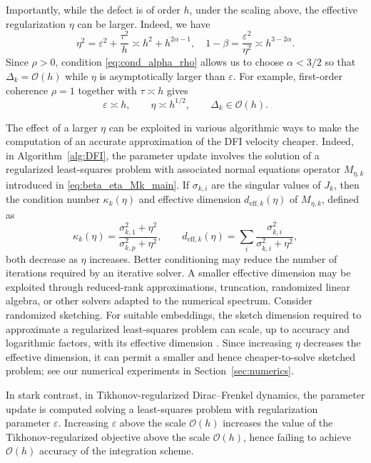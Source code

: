 \documentclass[oneside,11pt]{article}
\theoremstyle{remark}
\theoremstyle{thmstyleone}
\theoremstyle{thmstylethree}
\theoremstyle{thmstyletwo}
\begin{document}
{  Importantly, while the defect is of order $h$, under the scaling above, the effective regularization $\eta$ can be larger. 
  Indeed, we have 
  \begin{equation*}
    \eta^2
    =
    \varepsilon^2+\frac{\tau^2}{h}
    \asymp
    h^2+h^{2\alpha-1},
    \quad
    1-\beta = \frac{\varepsilon^2}{\eta^2} \asymp h^{3 - 2\alpha}
    .
  \end{equation*}
  Since $\rho > 0$, condition \eqref{eq:cond_alpha_rho} allows us to choose $\alpha < 3/2$ so that 
  $\Delta_k=\mathcal{O}(h)$ while $\eta$ is asymptotically larger than $\varepsilon$.
  For example, first-order coherence $\rho=1$ together with $\tau\asymp h$ gives
  \begin{equation*}
    \varepsilon\asymp h,
    \qquad
    \eta\asymp h^{1/2},
    \qquad
    \Delta_k \in \mathcal{O}(h).
  \end{equation*}

  The effect of a larger $\eta$ can be exploited in various algorithmic ways to make the computation of an accurate approximation of the DFI velocity cheaper.
  Indeed, in Algorithm~\ref{alg:DFI},  the parameter update involves the solution of a regularized least-squares problem with associated normal equations operator $M_{\eta,k}$ introduced in \eqref{eq:beta_eta_Mk_main}.
  If $\sigma_{k,i}$ are the singular values of $J_k$, then the condition number $\kappa_k(\eta)$ and effective dimension $d_{\mathrm{eff},k}(\eta)$ of $M_{\eta,k}$, defined as
  \begin{equation}
    \kappa_k(\eta)
    =
    \frac{\sigma_{k,1}^2+\eta^2}
    {\sigma_{k,p}^2+\eta^2},
    \qquad
    d_{\mathrm{eff},k}(\eta)
    =
    \sum_i
    \frac{\sigma_{k,i}^2}
    {\sigma_{k,i}^2+\eta^2},
  \end{equation}
  both decrease as $\eta$ increases.
  Better conditioning may reduce the number of iterations required by an iterative solver. A smaller effective dimension may be exploited through reduced-rank approximations, truncation, randomized linear algebra, or other solvers adapted to the numerical spectrum. Consider randomized sketching.
  For suitable embeddings, the sketch dimension required to approximate a regularized least-squares problem can scale, up to accuracy and logarithmic factors, with its effective dimension \cite{lacotte2020effective,pmlr-v80-lin18b}.
  Since increasing $\eta$ decreases the effective dimension, it can permit a smaller and hence cheaper-to-solve sketched problem; see our numerical experiments in Section~\ref{sec:numerics}.

  In stark contrast, in Tikhonov-regularized Dirac--Frenkel dynamics, the parameter update is computed solving a least-squares problem with regularization parameter $\varepsilon$. Increasing $\varepsilon$ above the scale $\mathcal{O}(h)$ increases the value of the Tikhonov-regularized objective above the scale $\mathcal{O}(h)$, hence failing to achieve $\mathcal{O}(h)$ accuracy of the integration scheme.
}
\end{document}
